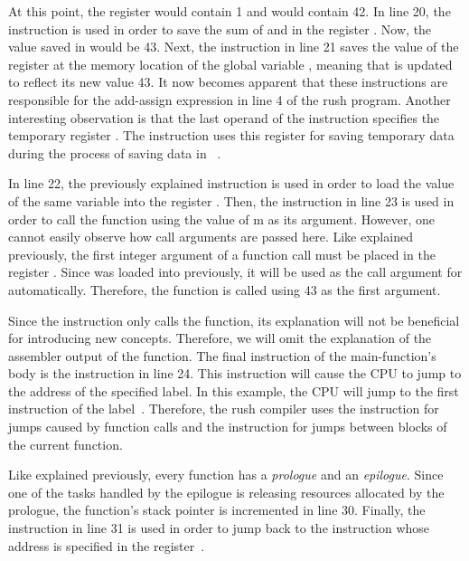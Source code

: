 At this point, the register  would contain 1 and  would contain 42.
In line 20, the  instruction is used in order to save the sum of  and  in the register .
Now, the value saved in  would be 43.
Next, the  instruction in line 21 saves the value of the register  at the memory location of the global variable , meaning that  is updated to reflect its new value 43.
It now becomes apparent that these instructions are responsible for the add-assign expression in line 4 of the rush program.
Another interesting observation is that the last operand of the  instruction specifies the temporary register .
The instruction uses this register for saving temporary data during the process of saving data in ~\cite[reference]{Patterson2017}.

In line 22, the previously explained  instruction is used in order to load the value of the same variable into the register .
Then, the  instruction in line 23 is used in order to call the  function using the value of m as its argument.
However, one cannot easily observe how call arguments are passed here.
Like explained previously, the first integer argument of a function call must be placed in the register .
Since  was loaded into  previously, it will be used as the call argument for  automatically.
Therefore, the  function is called using 43 as the first argument.

Since the  instruction only calls the  function, its explanation will not be beneficial for introducing new concepts.
Therefore, we will omit the explanation of the assembler output of the  function.
The final instruction of the main-function's body is the  instruction in line 24.
This instruction will cause the CPU to jump to the address of the specified label.
In this example, the CPU will jump to the first instruction of the  label~\cite[p.~17]{Patterson2017}.
Therefore, the rush compiler uses the  instruction for jumps caused by function calls and the  instruction for jumps between blocks of the current function.

Like explained previously, every function has a \emph{prologue} and an \emph{epilogue}.
Since one of the tasks handled by the epilogue is releasing resources allocated by the prologue, the function's stack pointer is incremented in line 30.
Finally, the  instruction in line 31 is used in order to jump back to the instruction whose address is specified in the  register~\cite[reference]{Patterson2017}.

